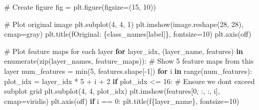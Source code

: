 \documentclass[
  letterpaper,
  DIV=11,
  numbers=noendperiod]{scrreprt}
\newenvironment{Shaded}{\begin{snugshade}}{\end{snugshade}}
\newcommand{\BuiltInTok}[1]{\textcolor[rgb]{0.00,0.23,0.31}{#1}}
\newcommand{\CommentTok}[1]{\textcolor[rgb]{0.37,0.37,0.37}{#1}}
\newcommand{\ControlFlowTok}[1]{\textcolor[rgb]{0.00,0.23,0.31}{\textbf{#1}}}
\newcommand{\DecValTok}[1]{\textcolor[rgb]{0.68,0.00,0.00}{#1}}
\newcommand{\KeywordTok}[1]{\textcolor[rgb]{0.00,0.23,0.31}{\textbf{#1}}}
\newcommand{\NormalTok}[1]{\textcolor[rgb]{0.00,0.23,0.31}{#1}}
\newcommand{\OperatorTok}[1]{\textcolor[rgb]{0.37,0.37,0.37}{#1}}
\newcommand{\SpecialCharTok}[1]{\textcolor[rgb]{0.37,0.37,0.37}{#1}}
\newcommand{\SpecialStringTok}[1]{\textcolor[rgb]{0.13,0.47,0.30}{#1}}
\newcommand{\StringTok}[1]{\textcolor[rgb]{0.13,0.47,0.30}{#1}}
\begin{document}
\begin{Shaded}
\begin{Highlighting}[]
    \CommentTok{\# Create figure}
\NormalTok{    fig }\OperatorTok{=}\NormalTok{ plt.figure(figsize}\OperatorTok{=}\NormalTok{(}\DecValTok{15}\NormalTok{, }\DecValTok{10}\NormalTok{))}
    
    \CommentTok{\# Plot original image}
\NormalTok{    plt.subplot(}\DecValTok{4}\NormalTok{, }\DecValTok{4}\NormalTok{, }\DecValTok{1}\NormalTok{)}
\NormalTok{    plt.imshow(image.reshape(}\DecValTok{28}\NormalTok{, }\DecValTok{28}\NormalTok{), cmap}\OperatorTok{=}\StringTok{\textquotesingle{}gray\textquotesingle{}}\NormalTok{)}
\NormalTok{    plt.title(}\SpecialStringTok{f\textquotesingle{}Original: }\SpecialCharTok{\{}\NormalTok{class\_names[label]}\SpecialCharTok{\}}\SpecialStringTok{\textquotesingle{}}\NormalTok{, fontsize}\OperatorTok{=}\DecValTok{10}\NormalTok{)}
\NormalTok{    plt.axis(}\StringTok{\textquotesingle{}off\textquotesingle{}}\NormalTok{)}
    
    \CommentTok{\# Plot feature maps for each layer}
    \ControlFlowTok{for}\NormalTok{ layer\_idx, (layer\_name, features) }\KeywordTok{in} \BuiltInTok{enumerate}\NormalTok{(}\BuiltInTok{zip}\NormalTok{(layer\_names, feature\_maps)):}
        \CommentTok{\# Show 5 feature maps from this layer}
\NormalTok{        num\_features }\OperatorTok{=} \BuiltInTok{min}\NormalTok{(}\DecValTok{5}\NormalTok{, features.shape[}\OperatorTok{{-}}\DecValTok{1}\NormalTok{])}
        \ControlFlowTok{for}\NormalTok{ i }\KeywordTok{in} \BuiltInTok{range}\NormalTok{(num\_features):}
\NormalTok{            plot\_idx }\OperatorTok{=}\NormalTok{ layer\_idx }\OperatorTok{*} \DecValTok{5} \OperatorTok{+}\NormalTok{ i }\OperatorTok{+} \DecValTok{2}
            \ControlFlowTok{if}\NormalTok{ plot\_idx }\OperatorTok{\textless{}=} \DecValTok{16}\NormalTok{:  }\CommentTok{\# Ensure we don\textquotesingle{}t exceed subplot grid}
\NormalTok{                plt.subplot(}\DecValTok{4}\NormalTok{, }\DecValTok{4}\NormalTok{, plot\_idx)}
\NormalTok{                plt.imshow(features[}\DecValTok{0}\NormalTok{, :, :, i], cmap}\OperatorTok{=}\StringTok{\textquotesingle{}viridis\textquotesingle{}}\NormalTok{)}
\NormalTok{                plt.axis(}\StringTok{\textquotesingle{}off\textquotesingle{}}\NormalTok{)}
                \ControlFlowTok{if}\NormalTok{ i }\OperatorTok{==} \DecValTok{0}\NormalTok{:}
\NormalTok{                    plt.title(}\SpecialStringTok{f\textquotesingle{}}\SpecialCharTok{\{}\NormalTok{layer\_name}\SpecialCharTok{\}}\SpecialStringTok{\textquotesingle{}}\NormalTok{, fontsize}\OperatorTok{=}\DecValTok{10}\NormalTok{)}
    

\end{Highlighting}
\end{Shaded}
\end{document}
